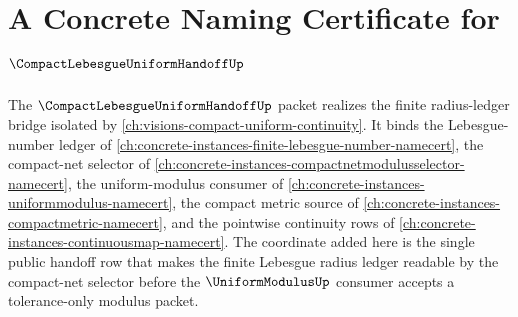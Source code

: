\chapter{A Concrete Naming Certificate for $\CompactLebesgueUniformHandoffUp$}
\label{ch:concrete-instances-compact-lebesgue-uniform-handoff-namecert}

The $\CompactLebesgueUniformHandoffUp$ packet realizes the finite radius-ledger bridge isolated by \autoref{ch:visions-compact-uniform-continuity}. It binds the Lebesgue-number ledger of \autoref{ch:concrete-instances-finite-lebesgue-number-namecert}, the compact-net selector of \autoref{ch:concrete-instances-compactnetmodulusselector-namecert}, the uniform-modulus consumer of \autoref{ch:concrete-instances-uniformmodulus-namecert}, the compact metric source of \autoref{ch:concrete-instances-compactmetric-namecert}, and the pointwise continuity rows of \autoref{ch:concrete-instances-continuousmap-namecert}. The coordinate added here is the single public handoff row that makes the finite Lebesgue radius ledger readable by the compact-net selector before the $\UniformModulusUp$ consumer accepts a tolerance-only modulus packet.


